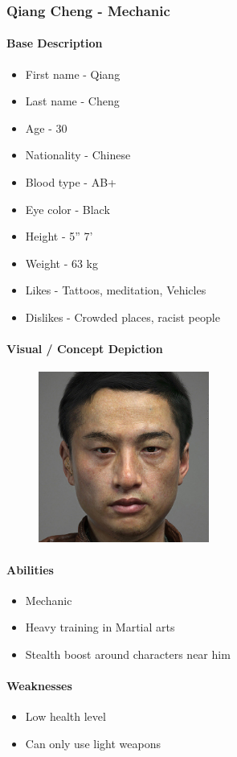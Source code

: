 \subsubsection{\Large Qiang Cheng - Mechanic}
	\paragraph{\Large Base Description}\mbox{}
		\begin{itemize}
			\item First name - Qiang
			\item Last name - Cheng
			\item Age - 30
			\item Nationality - Chinese
			\item Blood type - AB+
			\item Eye color - Black
			\item Height - 5” 7’
			\item Weight - 63 kg
			\item Likes - Tattoos, meditation, Vehicles
			\item Dislikes - Crowded places, racist people
		\end{itemize}
	\paragraph{\Large Visual / Concept Depiction}\mbox{}
		\begin{figure}[H]
			\centering
			\includegraphics[width=0.5\textwidth]{images/characters/cheng}
		\end{figure}
	\paragraph{\Large Abilities}\mbox{}
		\begin{itemize}
			\item Mechanic
			\item Heavy training in Martial arts
			\item Stealth boost around characters near him
		\end{itemize}
	\paragraph{\Large Weaknesses}\mbox{}
		\begin{itemize}
			\item Low health level
			\item Can only use light weapons
		\end{itemize}